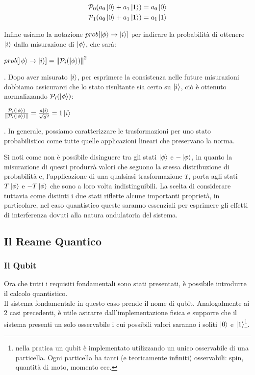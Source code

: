 \documentclass[12pt,a4paper,openright]{report}
\newcommand{\norm}[1]{\left\lVert#1\right\rVert}
\begin{document}
    \begin{center}
        \begin{align*}
            &\mathcal{P}_0(a_0\ket0 + a_1\ket1) = a_0\ket0 \\
            &\mathcal{P}_1(a_0\ket0 + a_1\ket1) = a_1\ket1
        \end{align*}    
    \end{center}
Infine usiamo la notazione $prob[\ket{\phi} \rightarrow \ket{i}]$ per indicare la probabilità di ottenere $\ket{i}$ dalla misurazione di $\ket{\phi}$, 
che sarà:
\begin{center}
    $prob[\ket{\phi} \rightarrow \ket{i}] = \norm{\mathcal{P}_i(\ket{\phi})}^2$
\end{center}
. Dopo aver misurato $\ket{i}$, per esprimere la consistenza nelle future misurazioni dobbiamo assicurarci che lo stato risultante sia certo su $\ket{i}$,
ciò è ottenuto normalizzando $\mathcal{P}_i(\ket{\phi})$:
\begin{center}
    $\frac{\mathcal{P}_i(\ket{\phi})}{\norm{\mathcal{P}_i(\ket{\phi})}}=\frac{a\ket{i}}{\sqrt{a^2}}=1\ket{i}$
\end{center}
. In generale, possiamo caratterizzare le trasformazioni per uno stato probabilistico come tutte quelle applicazioni lineari che preservano la norma.\par
Si noti come non è possibile disinguere tra gli stati $\ket{\phi}$ e $-\ket{\phi}$, in quanto la misurazione di questi produrrà valori che seguono la stessa
distribuzione di probabilità e, l'applicazione di una qualsiasi trasformazione $T$, porta agli stati $T\ket{\phi}$ e $-T\ket{\phi}$ che sono a loro volta
indistinguibili. La scelta di considerare tuttavia come distinti i due stati riflette alcune importanti proprietà, in particolare, nel
caso quantistico queste saranno essenziali per esprimere gli effetti di interferenza dovuti alla natura ondulatoria del sistema.   

\subsection{Il Reame Quantico}
\subsubsection{Il Qubit}
Ora che tutti i requisiti fondamentali sono stati presentati, è possibile introdurre il calcolo quantistico.\\
Il sistema fondamentale in questo caso prende il nome di qubit. Analogalmente ai 2 casi precedenti, è utile astrarre dall'implementazione fisica
e supporre che il sistema presenti un solo osservabile i cui possibili valori saranno i soliti $\ket0$ e $\ket1$\footnote{nella pratica un qubit è implementato utilizzando un unico osservabile di una particella. Ogni particella ha tanti (e teoricamente infiniti) osservabili: spin, quantità di moto, momento ecc. }.
\end{document}
